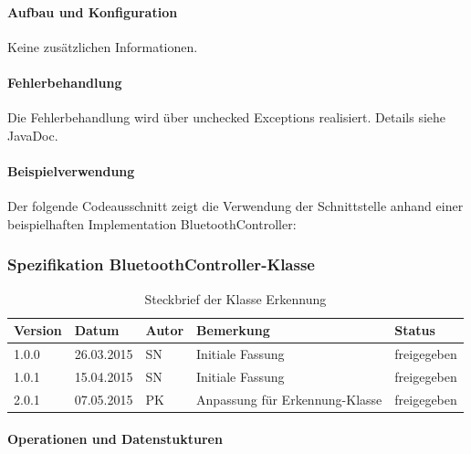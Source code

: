 \paragraph{Aufbau und Konfiguration} 
Keine zusätzlichen Informationen. \\
\paragraph{Fehlerbehandlung}
Die Fehlerbehandlung wird über unchecked Exceptions realisiert. Details siehe JavaDoc. \\
\paragraph{Beispielverwendung}
Der folgende Codeausschnitt zeigt die Verwendung der Schnittstelle anhand einer beispielhaften Implementation BluetoothController: \\


\subsubsection{Spezifikation BluetoothController-Klasse}


\begin{table}[h!]
	\begin{tabular}{|l|l|l|l|l|}
		\hline 
		Version & Datum & Autor & Bemerkung & Status \\ 
		\hline 
		1.0.0 & 26.03.2015 & SN & Initiale Fassung & freigegeben \\ 
		\hline 
		1.0.1 & 15.04.2015 & SN & Initiale Fassung & freigegeben \\ 
		\hline 
		2.0.1 & 07.05.2015 & PK & Anpassung für Erkennung-Klasse & freigegeben \\ 
		\hline 
	\end{tabular} 
	\caption{Steckbrief der Klasse Erkennung}
\end{table}

\paragraph{Operationen und Datenstukturen}


